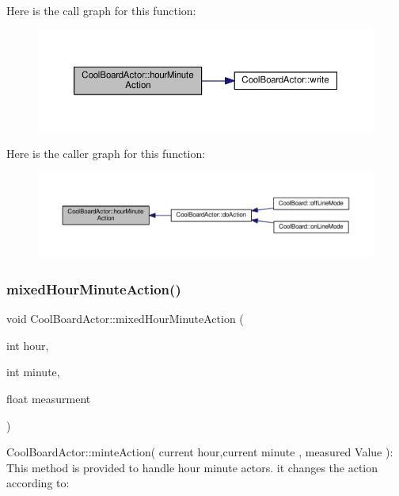 Here is the call graph for this function\+:
\nopagebreak
\begin{figure}[H]
\begin{center}
\leavevmode
\includegraphics[width=350pt]{dc/d69/class_cool_board_actor_a1eb1fbca19bc80aad20d2686d52317f8_cgraph}
\end{center}
\end{figure}
Here is the caller graph for this function\+:
\nopagebreak
\begin{figure}[H]
\begin{center}
\leavevmode
\includegraphics[width=350pt]{dc/d69/class_cool_board_actor_a1eb1fbca19bc80aad20d2686d52317f8_icgraph}
\end{center}
\end{figure}
\mbox{\label{class_cool_board_actor_ae6b2a17b0e73cfeb353ded2cc4e08109}} 
\subsubsection{\texorpdfstring{mixed\+Hour\+Minute\+Action()}{mixedHourMinuteAction()}}
{\footnotesize\ttfamily void Cool\+Board\+Actor\+::mixed\+Hour\+Minute\+Action (\begin{DoxyParamCaption}\item[{int}]{hour,  }\item[{int}]{minute,  }\item[{float}]{measurment }\end{DoxyParamCaption})}

Cool\+Board\+Actor\+::minte\+Action( current hour,current minute , measured Value )\+: This method is provided to handle hour minute actors. it changes the action according to\+:

